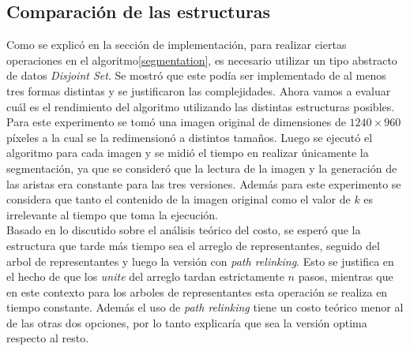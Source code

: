 \subsection{Comparaci\'on de las estructuras}
Como se explic\'o en la secci\'on de implementaci\'on, para realizar ciertas operaciones en el algoritmo\ref{segmentation}, es necesario utilizar un tipo abstracto de datos \textit{Disjoint Set}. Se mostr\'o que este pod\'ia ser implementado de al menos tres formas distintas y se justificaron las complejidades. Ahora vamos a evaluar cuál es el rendimiento del algoritmo utilizando las distintas estructuras posibles.\\
\indent Para este experimento se tom\'o una imagen original de dimensiones de $1240\times 960$ píxeles a la cual se la redimension\'o a distintos tama\~nos. Luego se ejecut\'o el algoritmo para cada imagen y se midi\'o el tiempo en realizar únicamente la segmentaci\'on, ya que se consider\'o que la lectura de la imagen y la generaci\'on de las aristas era constante para las tres versiones. Además para este experimento se considera que tanto el contenido de la imagen original como el valor de $k$ es irrelevante al tiempo que toma la ejecuci\'on.\\
\indent Basado en lo discutido sobre el an\'alisis te\'orico del costo, se esper\'o que la estructura que tarde m\'as tiempo sea el arreglo de representantes, seguido del arbol de representantes y luego la versi\'on con \textit{path relinking}. Esto se justifica en el hecho de que los \textit{unite} del arreglo tardan estrictamente $n$ pasos, mientras que en este contexto para los arboles de representantes esta operaci\'on se realiza en tiempo constante. Además el uso de \textit{path relinking} tiene un costo te\'orico menor al de las otras dos opciones, por lo tanto explicar\'ia que sea la versi\'on optima respecto al resto.
\vspace{-3mm}
